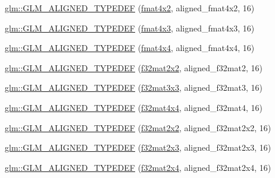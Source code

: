 \begin{DoxyCompactItemize}
\item 
\hyperlink{group__gtx__type__aligned_ga93f09768241358a287c4cca538f1f7e7}{glm\+::\+G\+L\+M\+\_\+\+A\+L\+I\+G\+N\+E\+D\+\_\+\+T\+Y\+P\+E\+D\+EF} (\hyperlink{group__gtc__type__precision_ga9325d382b334066a4c90a814c9040359}{fmat4x2}, aligned\+\_\+fmat4x2, 16)
\item 
\hyperlink{group__gtx__type__aligned_ga7c117e3ecca089e10247b1d41d88aff9}{glm\+::\+G\+L\+M\+\_\+\+A\+L\+I\+G\+N\+E\+D\+\_\+\+T\+Y\+P\+E\+D\+EF} (\hyperlink{group__gtc__type__precision_ga89195b7b13a41b0f1d34a962d1f66bfb}{fmat4x3}, aligned\+\_\+fmat4x3, 16)
\item 
\hyperlink{group__gtx__type__aligned_ga07c75cd04ba42dc37fa3e105f89455c5}{glm\+::\+G\+L\+M\+\_\+\+A\+L\+I\+G\+N\+E\+D\+\_\+\+T\+Y\+P\+E\+D\+EF} (\hyperlink{group__gtc__type__precision_ga16b508b75c7213ba6b24055ff3b7503d}{fmat4x4}, aligned\+\_\+fmat4x4, 16)
\item 
\hyperlink{group__gtx__type__aligned_ga65ff0d690a34a4d7f46f9b2eb51525ee}{glm\+::\+G\+L\+M\+\_\+\+A\+L\+I\+G\+N\+E\+D\+\_\+\+T\+Y\+P\+E\+D\+EF} (\hyperlink{group__gtc__type__precision_gae7ebbb68656a5fd879d536b5d8452fb1}{f32mat2x2}, aligned\+\_\+f32mat2, 16)
\item 
\hyperlink{group__gtx__type__aligned_gadd8ddbe2bf65ccede865ba2f510176dc}{glm\+::\+G\+L\+M\+\_\+\+A\+L\+I\+G\+N\+E\+D\+\_\+\+T\+Y\+P\+E\+D\+EF} (\hyperlink{group__gtc__type__precision_ga715b36ea1e2d1ffaaef7517cc78b3877}{f32mat3x3}, aligned\+\_\+f32mat3, 16)
\item 
\hyperlink{group__gtx__type__aligned_gaf18dbff14bf13d3ff540c517659ec045}{glm\+::\+G\+L\+M\+\_\+\+A\+L\+I\+G\+N\+E\+D\+\_\+\+T\+Y\+P\+E\+D\+EF} (\hyperlink{group__gtc__type__precision_gac4a4b2671cbf50ab95c55fce2bfcd811}{f32mat4x4}, aligned\+\_\+f32mat4, 16)
\item 
\hyperlink{group__gtx__type__aligned_ga66339f6139bf7ff19e245beb33f61cc8}{glm\+::\+G\+L\+M\+\_\+\+A\+L\+I\+G\+N\+E\+D\+\_\+\+T\+Y\+P\+E\+D\+EF} (\hyperlink{group__gtc__type__precision_gae7ebbb68656a5fd879d536b5d8452fb1}{f32mat2x2}, aligned\+\_\+f32mat2x2, 16)
\item 
\hyperlink{group__gtx__type__aligned_ga1558a48b3934011b52612809f443e46d}{glm\+::\+G\+L\+M\+\_\+\+A\+L\+I\+G\+N\+E\+D\+\_\+\+T\+Y\+P\+E\+D\+EF} (\hyperlink{group__gtc__type__precision_gac4573d3d213b2bce23943caef565a211}{f32mat2x3}, aligned\+\_\+f32mat2x3, 16)
\item 
\hyperlink{group__gtx__type__aligned_gaa52e5732daa62851627021ad551c7680}{glm\+::\+G\+L\+M\+\_\+\+A\+L\+I\+G\+N\+E\+D\+\_\+\+T\+Y\+P\+E\+D\+EF} (\hyperlink{group__gtc__type__precision_gab0eab14575c18077fd3415539bce685a}{f32mat2x4}, aligned\+\_\+f32mat2x4, 16)

\end{DoxyCompactItemize}
